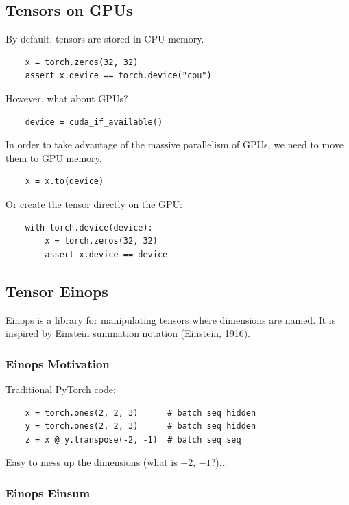 \documentclass[12pt,twoside]{article}
\begin{document}
\subsection*{Tensors on GPUs}

By default, tensors are stored in CPU memory.

\begin{verbatim}
    x = torch.zeros(32, 32)
    assert x.device == torch.device("cpu")
\end{verbatim}

However, what about GPUs?

\begin{verbatim}
    device = cuda_if_available()
\end{verbatim}

In order to take advantage of the massive parallelism of GPUs, we need to move them to GPU memory.

\begin{verbatim}
    x = x.to(device)
\end{verbatim}

Or create the tensor directly on the GPU:

\begin{verbatim}
    with torch.device(device):
        x = torch.zeros(32, 32)
        assert x.device == device
\end{verbatim}

\subsection*{Tensor Einops}

Einops is a library for manipulating tensors where dimensions are named.
It is inspired by Einstein summation notation (Einstein, 1916).

\subsubsection*{Einops Motivation}

Traditional PyTorch code:

\begin{verbatim}
    x = torch.ones(2, 2, 3)      # batch seq hidden  
    y = torch.ones(2, 2, 3)      # batch seq hidden  
    z = x @ y.transpose(-2, -1)  # batch seq seq 
\end{verbatim} 

Easy to mess up the dimensions (what is \(-2\), \(-1\)?)...

\subsubsection*{Einops Einsum}
\end{document}
